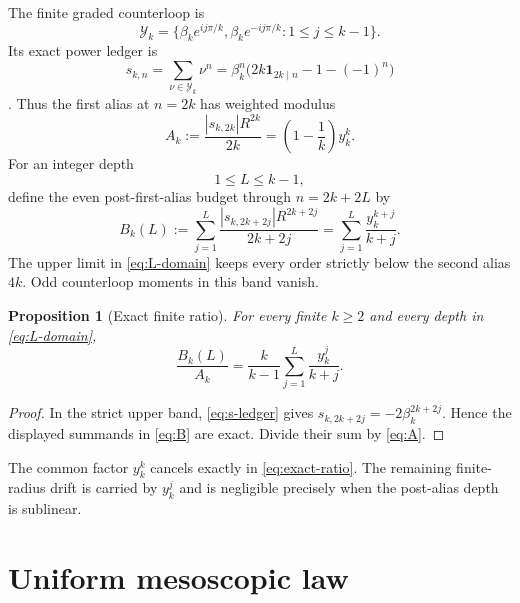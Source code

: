 \documentclass[11pt]{article}
\newtheorem{proposition}[theorem]{Proposition}
\theoremstyle{remark}
\newcommand{\cY}{\mathcal Y}
\newcommand{\one}{\mathbf 1}
\begin{document}
The finite graded counterloop is
\begin{equation}\label{eq:Y}
 \cY_k=\{\beta_ke^{ij\pi/k},\beta_ke^{-ij\pi/k}:1\le j\le k-1\}.
\end{equation}
Its exact power ledger is
\begin{equation}\label{eq:s-ledger}
 s_{k,n}=\sum_{\nu\in\cY_k}\nu^n
 =\beta_k^n\bigl(2k\one_{2k\mid n}-1-(-1)^n\bigr)
\end{equation}
\citep{WangAliasLedger2026,WangHeadCounterloop2026}.  Thus the first alias
at $n=2k$ has weighted modulus
\begin{equation}\label{eq:A}
 A_k:=\frac{|s_{k,2k}|R^{2k}}{2k}
 =\left(1-\frac1k\right)y_k^k.
\end{equation}
For an integer depth
\begin{equation}\label{eq:L-domain}
 1\le L\le k-1,
\end{equation}
define the even post-first-alias budget through $n=2k+2L$ by
\begin{equation}\label{eq:B}
 B_k(L):=\sum_{j=1}^L
 \frac{|s_{k,2k+2j}|R^{2k+2j}}{2k+2j}
 =\sum_{j=1}^L\frac{y_k^{k+j}}{k+j}.
\end{equation}
The upper limit in \eqref{eq:L-domain} keeps every order strictly below the
second alias $4k$.  Odd counterloop moments in this band vanish.

\begin{proposition}[Exact finite ratio]\label{prop:exact-ratio}
For every finite $k\ge2$ and every depth in \eqref{eq:L-domain},
\begin{equation}\label{eq:exact-ratio}
 \boxed{
 \frac{B_k(L)}{A_k}
 =\frac{k}{k-1}\sum_{j=1}^L\frac{y_k^j}{k+j}.}
\end{equation}
\end{proposition}

\begin{proof}
In the strict upper band, \eqref{eq:s-ledger} gives
$s_{k,2k+2j}=-2\beta_k^{2k+2j}$.  Hence the displayed summands in
\eqref{eq:B} are exact.  Divide their sum by \eqref{eq:A}.
\end{proof}

The common factor $y_k^k$ cancels exactly in
\eqref{eq:exact-ratio}.  The remaining finite-radius drift is carried by
$y_k^j$ and is negligible precisely when the post-alias depth is
sublinear.

\section{Uniform mesoscopic law}
\end{document}
